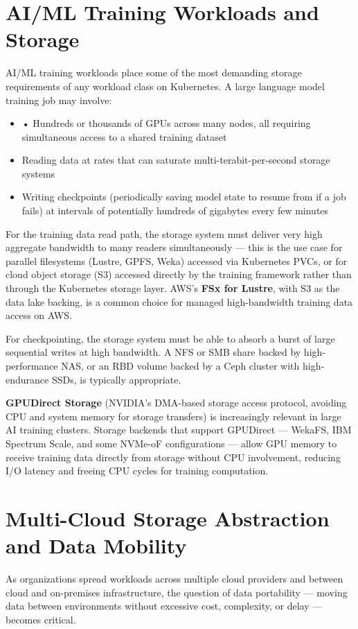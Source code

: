 \section{AI/ML Training Workloads and Storage}
AI/ML training workloads place some of the most demanding storage requirements of any workload class on Kubernetes. A large language model training job may involve:

\begin{itemize}
  \item • Hundreds or thousands of GPUs across many nodes, all requiring simultaneous access to a shared training dataset
  \item Reading data at rates that can saturate multi-terabit-per-second storage systems
  \item Writing checkpoints (periodically saving model state to resume from if a job fails) at intervals of potentially hundreds of gigabytes every few minutes
\end{itemize}

For the training data read path, the storage system must deliver very high aggregate bandwidth to many readers simultaneously --- this is the use case for parallel filesystems (Lustre, GPFS, Weka) accessed via Kubernetes PVCs, or for cloud object storage (S3) accessed directly by the training framework rather than through the Kubernetes storage layer. AWS's \textbf{FSx for Lustre}, with S3 as the data lake backing, is a common choice for managed high-bandwidth training data access on AWS.

For checkpointing, the storage system must be able to absorb a burst of large sequential writes at high bandwidth. A NFS or SMB share backed by high-performance NAS, or an RBD volume backed by a Ceph cluster with high-endurance SSDs, is typically appropriate.

\textbf{GPUDirect Storage} (NVIDIA's DMA-based storage access protocol, avoiding CPU and system memory for storage transfers) is increasingly relevant in large AI training clusters. Storage backends that support GPUDirect --- WekaFS, IBM Spectrum Scale, and some NVMe-oF configurations --- allow GPU memory to receive training data directly from storage without CPU involvement, reducing I/O latency and freeing CPU cycles for training computation.

\section{Multi-Cloud Storage Abstraction and Data Mobility}
As organizations spread workloads across multiple cloud providers and between cloud and on-premises infrastructure, the question of data portability --- moving data between environments without excessive cost, complexity, or delay --- becomes critical.

